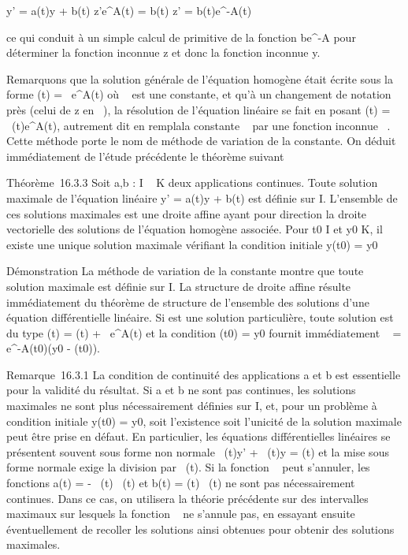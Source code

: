 y' = a(t)y + b(t) \Leftrightarrow z'e^A(t) =
b(t) \Leftrightarrow z' = b(t)e^-A(t)

ce qui conduit à un simple calcul de primitive de la fonction
be^-A pour déterminer la fonction inconnue z et donc la
fonction inconnue y.

Remarquons que la solution générale de l'équation homogène était écrite
sous la forme \phi(t) = \lambda~e^A(t) où \lambda~ est une constante, et qu'à
un changement de notation près (celui de z en \lambda~), la résolution de
l'équation linéaire se fait en posant \phi(t) = \lambda~(t)e^A(t),
autrement dit en rempla\ccant la constante \lambda~ par une
fonction inconnue \lambda~. Cette méthode porte le nom de méthode de variation
de la constante. On déduit immédiatement de l'étude précédente le
théorème suivant

Théorème~16.3.3 Soit a,b : I \rightarrow~ K deux applications continues. Toute
solution maximale de l'équation linéaire y' = a(t)y + b(t) est définie
sur I. L'ensemble de ces solutions maximales est une droite affine ayant
pour direction la droite vectorielle des solutions de l'équation
homogène associée. Pour t0 \in I et y0 \in K, il existe
une unique solution maximale vérifiant la condition initiale
y(t0) = y0

Démonstration La méthode de variation de la constante montre que toute
solution maximale est définie sur I. La structure de droite affine
résulte immédiatement du théorème de structure de l'ensemble des
solutions d'une équation différentielle linéaire. Si  est
une solution particulière, toute solution est du type \phi(t) =
(t) + \lambda~e^A(t) et la condition \phi(t0) =
y0 fournit immédiatement \lambda~ =
e^-A(t0)(y0 -
(t0)).

Remarque~16.3.1 La condition de continuité des applications a et b est
essentielle pour la validité du résultat. Si a et b ne sont pas
continues, les solutions maximales ne sont plus nécessairement définies
sur I, et, pour un problème à condition initiale y(t0) =
y0, soit l'existence soit l'unicité de la solution maximale
peut être prise en défaut. En particulier, les équations différentielles
linéaires se présentent souvent sous forme non normale \alpha~(t)y' + \beta~(t)y =
\gamma(t) et la mise sous forme normale exige la division par \alpha~(t). Si la
fonction \alpha~ peut s'annuler, les fonctions a(t) = - \beta~(t)
\over \alpha~(t) et b(t) = \gamma(t) \over \alpha~(t)
ne sont pas nécessairement continues. Dans ce cas, on utilisera la
théorie précédente sur des intervalles maximaux sur lesquels la fonction
\alpha~ ne s'annule pas, en essayant ensuite éventuellement de recoller les
solutions ainsi obtenues pour obtenir des solutions maximales.

